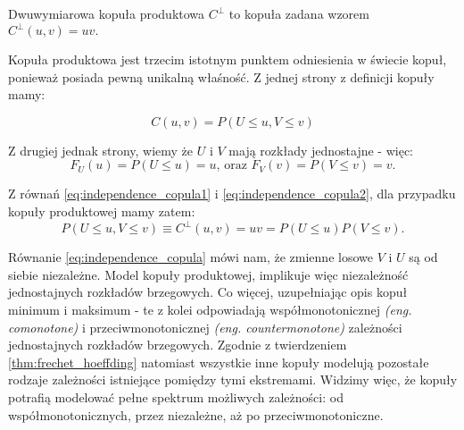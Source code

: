\begin{df}
	Dwuwymiarowa kopuła produktowa $C^{\perp}$ to kopuła zadana wzorem $C^{\perp}(u, v) = uv.$
\end{df}

Kopuła produktowa jest trzecim istotnym punktem odniesienia w świecie kopuł, ponieważ posiada pewną unikalną właśność. Z jednej strony z definicji kopuły mamy:

\begin{equation}
C(u, v) = P(U \leqslant u, V \leqslant v )
\label{eq:independence_copula1}
\end{equation}

Z drugiej jednak strony, wiemy że $U$ i $V$ mają rozkłady jednostajne - więc:
\begin{equation}
	F_U(u) = P(U \leqslant u) = u\text{, oraz } F_V(v) = P(V \leqslant v) = v.
\label{eq:independence_copula2}
\end{equation}

Z równań \ref{eq:independence_copula1} i \ref{eq:independence_copula2}, dla przypadku kopuły produktowej mamy zatem:
\begin{equation}
	P(U \leqslant u, V \leqslant v ) \equiv C^{\perp}(u, v) = uv = P(U \leqslant u) P(V \leqslant v).
	\label{eq:independence_copula}
\end{equation}

Równanie \ref{eq:independence_copula} mówi nam, że zmienne losowe $V$ i $U$ są od siebie niezależne. Model kopuły produktowej, implikuje więc niezależność jednostajnych rozkładów brzegowych.
Co więcej, uzupełniając opis kopuł minimum i maksimum - te z kolei odpowiadają współmonotonicznej \emph{(eng. comonotone)} i przeciwmonotonicznej \emph{(eng. countermonotone)} zależności jednostajnych rozkładów brzegowych. Zgodnie z twierdzeniem \ref{thm:frechet_hoeffding} natomiast wszystkie inne kopuły modelują pozostałe rodzaje zależności istniejące pomiędzy tymi ekstremami. Widzimy więc, że kopuły potrafią modelować pełne spektrum możliwych zależności: od współmonotonicznych, przez niezależne, aż po przeciwmonotoniczne. 